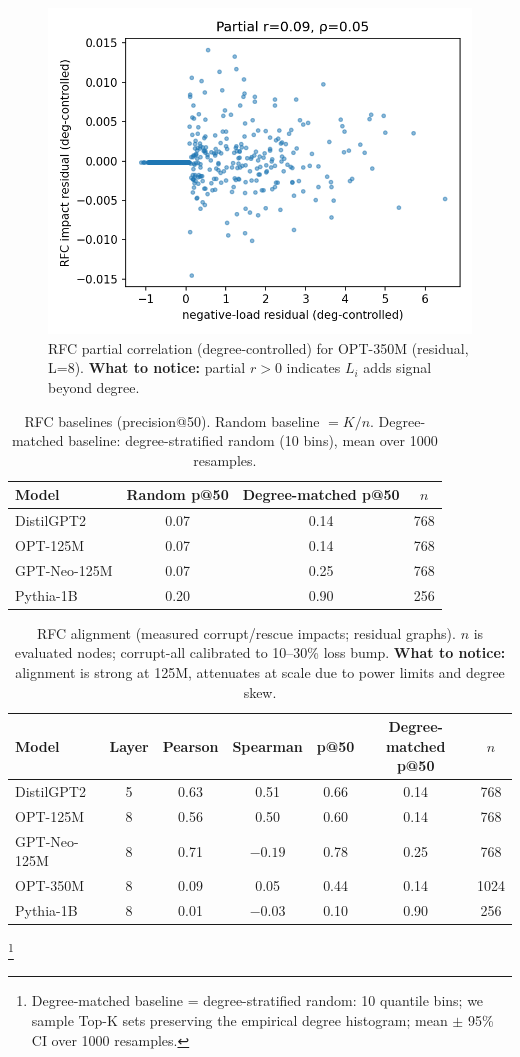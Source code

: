 \documentclass[11pt]{article}
\newcommand{\1}{\mathbf{1}}
\begin{document}
\begin{figure}[t]
\centering
\includegraphics[width=0.42\linewidth]{figs/rfc_partial_facebook_opt-350m_residual_L8}
\caption{RFC partial correlation (degree-controlled) for OPT-350M (residual, L=8). \textbf{What to notice:} partial $r>0$ indicates $L_i$ adds signal beyond degree.}
\label{fig:rfc_partial}
\end{figure}

\begin{table}[t]
\centering
\caption{RFC baselines (precision@50). Random baseline $=K/n$. Degree-matched baseline: degree-stratified random (10 bins), mean over 1000 resamples.}
\label{tab:rfc_baselines}
\begin{tabular}{lccc}
\toprule
Model & Random p@50 & Degree-matched p@50 & $n$ \\
\midrule
DistilGPT2 & 0.07 & 0.14 & 768 \\
OPT-125M & 0.07 & 0.14 & 768 \\
GPT-Neo-125M & 0.07 & 0.25 & 768 \\
Pythia-1B & 0.20 & 0.90 & 256 \\
\bottomrule
\end{tabular}
\end{table}

\begin{table}[t]
\centering
\caption{RFC alignment (measured corrupt/rescue impacts; residual graphs). $n$ is evaluated nodes; corrupt-all calibrated to 10--30\% loss bump. \textbf{What to notice:} alignment is strong at 125M, attenuates at scale due to power limits and degree skew.}
\label{tab:rfc}
\begin{tabular}{lcccccc}
\toprule
Model & Layer & Pearson & Spearman & p@50 & Degree-matched p@50 & $n$ \\
\midrule
DistilGPT2 & 5 & 0.63 & 0.51 & 0.66 & 0.14 & 768 \\
OPT-125M & 8 & 0.56 & 0.50 & 0.60 & 0.14 & 768 \\
GPT-Neo-125M & 8 & 0.71 & $-0.19$ & 0.78 & 0.25 & 768 \\
OPT-350M & 8 & 0.09 & 0.05 & 0.44 & 0.14 & 1024 \\
Pythia-1B & 8 & 0.01 & $-0.03$ & 0.10 & 0.90 & 256 \\
\bottomrule
\end{tabular}
\footnotesize\footnote{Degree-matched baseline = degree-stratified random: 10 quantile bins; we sample Top-K sets preserving the empirical degree histogram; mean $\pm$ 95\% CI over 1000 resamples.}
\end{table}
\end{document}

